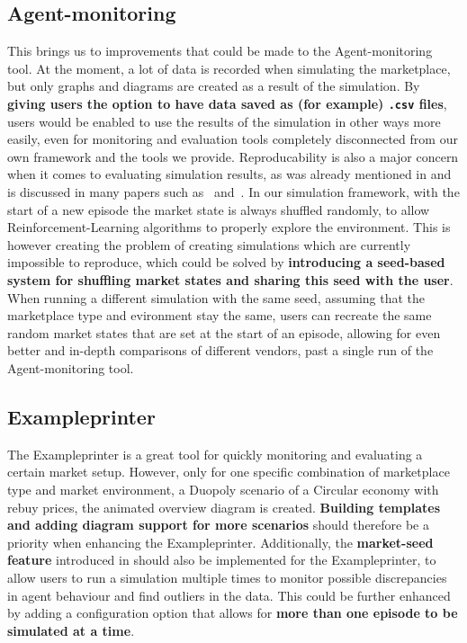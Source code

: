 \subsection*{Agent-monitoring}\label{subsec:FutureAgentMonitoring}

This brings us to improvements that could be made to the Agent-monitoring tool. At the moment, a lot of data is recorded when simulating the marketplace, but only graphs and diagrams are created as a result of the simulation. By \textbf{giving users the option to have data saved as (for example) \texttt{.csv} files}, users would be enabled to use the results of the simulation in other ways more easily, even for monitoring and evaluation tools completely disconnected from our own framework and the tools we provide. Reproducability is also a major concern when it comes to evaluating simulation results, as was already mentioned in  and is discussed in many papers such as~\cite{DRLThatMatters} and~\cite{ReproducabilityRL}. In our simulation framework, with the start of a new episode the market state is always shuffled randomly, to allow Reinforcement-Learning algorithms to properly explore the environment. This is however creating the problem of creating simulations which are currently impossible to reproduce, which could be solved by \textbf{introducing a seed-based system for shuffling market states and sharing this seed with the user}. When running a different simulation with the same seed, assuming that the marketplace type and evironment stay the same, users can recreate the same random market states that are set at the start of an episode, allowing for even better and in-depth comparisons of different vendors, past a single run of the Agent-monitoring tool.

\subsection*{Exampleprinter}\label{subsec:FutureExampleprinter}

The Exampleprinter is a great tool for quickly monitoring and evaluating a certain market setup. However, only for one specific combination of marketplace type and market environment, a Duopoly scenario of a Circular economy with rebuy prices, the animated overview diagram is created. \textbf{Building templates and adding diagram support for more scenarios} should therefore be a priority when enhancing the Exampleprinter. Additionally, the \textbf{market-seed feature} introduced in  should also be implemented for the Exampleprinter, to allow users to run a simulation multiple times to monitor possible discrepancies in agent behaviour and find outliers in the data. This could be further enhanced by adding a configuration option that allows for \textbf{more than one episode to be simulated at a time}.

